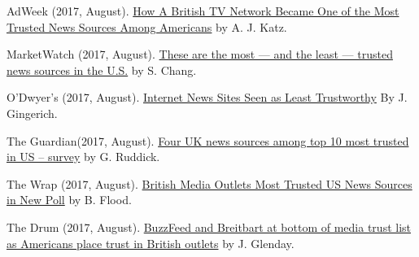 \begin{bibenum}
    \item[] AdWeek (2017, August).
      \href{http://www.adweek.com/tvnewser/how-a-british-tv-network-became-one-of-the-most-trusted-news-sources-among-americans/339872}{How A British TV Network Became One of the Most Trusted News Sources Among Americans} by A. J. Katz.
    \item[] MarketWatch (2017, August).
      \href{https://www.marketwatch.com/story/these-are-the-most-and-the-least-trusted-news-sources-in-the-us-2017-08-03}{These are the most — and the least — trusted news sources in the U.S.} by S. Chang.
    \item[] O'Dwyer's (2017, August).
      \href{http://www.odwyerpr.com/story/public/9210/2017-08-08/internet-news-sites-seen-as-least-trustworthy.html}{Internet News Sites Seen as Least Trustworthy} By J. Gingerich.
    \item[] The Guardian(2017, August).
      \href{https://www.theguardian.com/media/2017/aug/09/four-uk-news-sources-among-top-10-most-trusted-in-us-survey}{Four UK news sources among top 10 most trusted in US – survey} by G. Ruddick.
    \item[] The Wrap (2017, August).
      \href{https://www.thewrap.com/british-media-outlets-most-trusted-us-news-sources-in-new-poll/}{British Media Outlets Most Trusted US News Sources in New Poll} by B. Flood.
    \item[] The Drum (2017, August).
      \href{http://www.thedrum.com/news/2017/08/08/buzzfeed-and-breitbart-bottom-media-trust-list-americans-place-trust-british-outlets}{BuzzFeed and Breitbart at bottom of media trust list as Americans place trust in British outlets} by J. Glenday.
  \end{bibenum}
